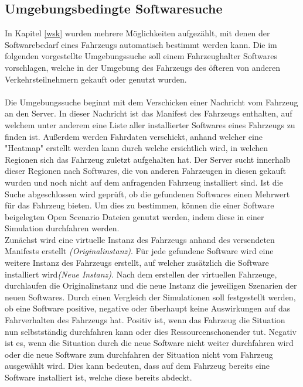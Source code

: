 \subsection{Umgebungsbedingte Softwaresuche}\label{umgebungssuche}
In Kapitel \ref{wsk} wurden mehrere Möglichkeiten aufgezählt, mit denen der Softwarebedarf eines Fahrzeugs automatisch bestimmt werden kann. Die im folgenden vorgestellte Umgebungssuche soll einem Fahrzeughalter Softwares vorschlagen, welche in der Umgebung des Fahrzeugs des öfteren von anderen Verkehrsteilnehmern gekauft oder genutzt wurden.\\\\
Die Umgebungssuche beginnt mit dem Verschicken einer Nachricht vom Fahrzeug an den Server. In dieser Nachricht ist das Manifest des Fahrzeugs enthalten, auf welchem unter anderem eine Liste aller installierter Softwares eines Fahrzeugs zu finden ist. Außerdem werden Fahrdaten  verschickt, anhand welcher eine "Heatmap" erstellt werden kann durch welche ersichtlich wird, in welchen Regionen sich das Fahrzeug zuletzt aufgehalten hat. Der Server sucht innerhalb dieser Regionen nach Softwares, die von anderen Fahrzeugen in diesen gekauft wurden und noch nicht auf dem anfragenden Fahrzeug installiert sind. Ist die Suche abgeschlossen wird geprüft, ob die gefundenen Softwares einen Mehrwert für das Fahrzeug bieten. Um dies zu bestimmen, können die einer Software beigelegten Open Scenario Dateien genutzt werden, indem diese in einer Simulation durchfahren werden.\\

Zunächst wird eine virtuelle Instanz des Fahrzeugs anhand des versendeten Manifests erstellt \textit{(Originalinstanz)}. Für jede gefundene Software wird eine weitere Instanz des Fahrzeugs erstellt, auf welcher zusätzlich die Software installiert wird\textit{(Neue Instanz)}. Nach dem erstellen der virtuellen Fahrzeuge, durchlaufen die Originalinstanz und die neue Instanz die jeweiligen Szenarien der neuen Softwares. Durch einen Vergleich der Simulationen soll festgestellt werden, ob eine Software positive, negative oder überhaupt keine Auswirkungen auf das Fahrverhalten des Fahrzeugs hat. Positiv ist, wenn das Fahrzeug die Situation nun selbstständig durchfahren kann oder dies Ressourcenschonender tut. Negativ  ist es, wenn die Situation durch die neue Software nicht weiter durchfahren wird oder die neue Software zum durchfahren der Situation nicht vom Fahrzeug ausgewählt wird. Dies kann bedeuten, dass auf dem Fahrzeug bereits eine Software installiert ist, welche diese bereits abdeckt.

